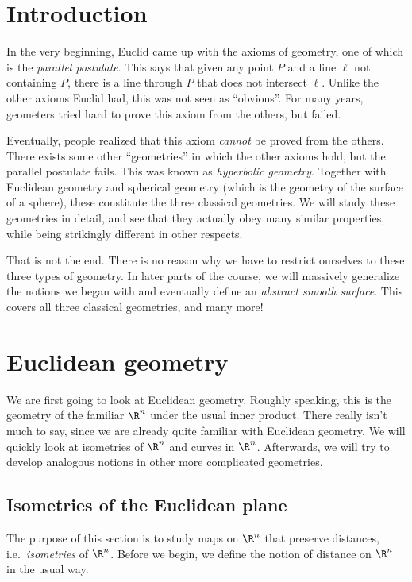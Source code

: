 \documentclass[a4paper]{article}
\begin{document}
\tableofcontents
\setcounter{section}{-1}
\section{Introduction}
In the very beginning, Euclid came up with the axioms of geometry, one of which is the \emph{parallel postulate}. This says that given any point $P$ and a line $\ell$ not containing $P$, there is a line through $P$ that does not intersect $\ell$. Unlike the other axioms Euclid had, this was not seen as ``obvious''. For many years, geometers tried hard to prove this axiom from the others, but failed.

Eventually, people realized that this axiom \emph{cannot} be proved from the others. There exists some other ``geometries'' in which the other axioms hold, but the parallel postulate fails. This was known as \emph{hyperbolic geometry}. Together with Euclidean geometry and spherical geometry (which is the geometry of the surface of a sphere), these constitute the three classical geometries. We will study these geometries in detail, and see that they actually obey many similar properties, while being strikingly different in other respects.

That is not the end. There is no reason why we have to restrict ourselves to these three types of geometry. In later parts of the course, we will massively generalize the notions we began with and eventually define an \emph{abstract smooth surface}. This covers all three classical geometries, and many more!

\section{Euclidean geometry}
We are first going to look at Euclidean geometry. Roughly speaking, this is the geometry of the familiar $\R^n$ under the usual inner product. There really isn't much to say, since we are already quite familiar with Euclidean geometry. We will quickly look at isometries of $\R^n$ and curves in $\R^n$. Afterwards, we will try to develop analogous notions in other more complicated geometries.

\subsection{Isometries of the Euclidean plane}
The purpose of this section is to study maps on $\R^n$ that preserve distances, i.e.\ \emph{isometries} of $\R^n$. Before we begin, we define the notion of distance on $\R^n$ in the usual way.
\end{document}
